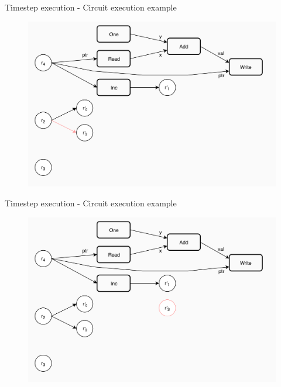 \documentclass[xcolor={usenames}]{beamer}
\begin{document}
  \begin{frame}{Timestep execution - Circuit execution example}
  	\begin{figure}
  		\centering
  		\includegraphics[width=\textwidth]{../figures/example-circuit-17.png}
  	\end{figure}
  \end{frame}
  \begin{frame}{Timestep execution - Circuit execution example}
  	\begin{figure}
  		\centering
  		\includegraphics[width=\textwidth]{../figures/example-circuit-18.png}
  	\end{figure}
  \end{frame}
\end{document}
